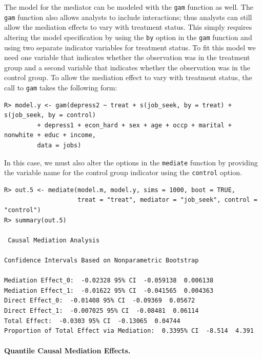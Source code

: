 \documentclass[11pt,letterpaper]{article}
\theoremstyle{plain}
\begin{document}
The model for the mediator can be modeled with the \texttt{gam}
function as well.  The \texttt{gam} function also allows analysts to
include interactions; thus analysts can still allow the mediation
effects to vary with treatment status.  This simply requires altering
the model specification by using the \texttt{by} option in the
\texttt{gam} function and using two separate indicator variables for
treatment status.  To fit this model we need one variable that
indicates whether the observation was in the treatment group and a
second variable that indicates whether the observation was in the
control group.  To allow the mediation effect to vary with treatment
status, the call to \texttt{gam} takes the following form:
\begin{verbatim}
R> model.y <- gam(depress2 ~ treat + s(job_seek, by = treat) + s(job_seek, by = control)
         + depress1 + econ_hard + sex + age + occp + marital + nonwhite + educ + income,
         data = jobs)
\end{verbatim}
In this case, we must also alter the options in the \texttt{mediate}
function by providing the variable
name for the control group indicator using the \texttt{control} option.
\begin{verbatim}
R> out.5 <- mediate(model.m, model.y, sims = 1000, boot = TRUE,
                    treat = "treat", mediator = "job_seek", control = "control")
R> summary(out.5)

 Causal Mediation Analysis

Confidence Intervals Based on Nonparametric Bootstrap

Mediation Effect_0:  -0.02328 95% CI  -0.059138  0.006138
Mediation Effect_1:  -0.01622 95% CI  -0.041565  0.004363
Direct Effect_0:  -0.01408 95% CI  -0.09369  0.05672
Direct Effect_1:  -0.007025 95% CI  -0.08481  0.06114
Total Effect:  -0.0303 95% CI  -0.13065  0.04744
Proportion of Total Effect via Mediation:  0.3395% CI  -8.514  4.391
\end{verbatim}

\paragraph{Quantile Causal Mediation Effects.}
\end{document}

